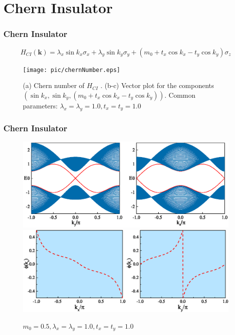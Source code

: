 \documentclass{beamer}
\begin{document}
\section{Chern Insulator}
\begin{frame}
\frametitle{Chern Insulator}
\begin{equation}
H_{CI}(\mathbf{k})=\lambda_x\sin k_x\sigma_x+\lambda_y\sin k_y\sigma_y+(m_0+t_x\cos k_x-t_y\cos k_y)\sigma_z
\end{equation}
\begin{figure}[h]
\centering
\texttt{[image: pic/chernNumber.eps]}
\caption{(a) Chern number of $H_{CI}$ . (b-c) Vector plot for the components $(\sin k_x,\sin k_y,(m_0+t_x\cos k_x -t_y\cos k_y))$. Common parameters:  $\lambda_x=\lambda_y=1.0,t_x=t_y=1.0$}
\end{figure}
\end{frame}
\begin{frame}
\frametitle{Chern Insulator}
\begin{figure}[h]
\centering
\includegraphics[scale=0.4]{pic/cy-normal.eps}
\includegraphics[scale=0.4]{pic/Berry-phase.eps}
\caption{$m_0=0.5,\lambda_x=\lambda_y=1.0,t_x=t_y=1.0$}
\end{figure}
\end{frame}
\end{document}

